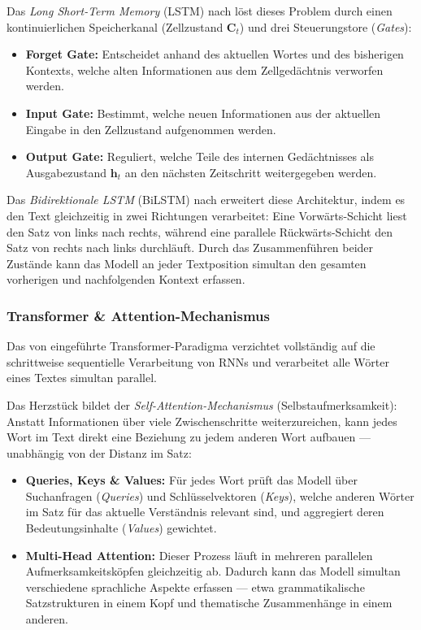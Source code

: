 Das \textit{Long Short-Term Memory} (LSTM) nach \citet{hochreiter1997long} löst dieses Problem durch einen kontinuierlichen Speicherkanal (Zellzustand $\mathbf{C}_t$) und drei Steuerungstore (\textit{Gates}):
\begin{itemize}
    \item \textbf{Forget Gate:} Entscheidet anhand des aktuellen Wortes und des bisherigen Kontexts, welche alten Informationen aus dem Zellgedächtnis verworfen werden.
    \item \textbf{Input Gate:} Bestimmt, welche neuen Informationen aus der aktuellen Eingabe in den Zellzustand aufgenommen werden.
    \item \textbf{Output Gate:} Reguliert, welche Teile des internen Gedächtnisses als Ausgabezustand $\mathbf{h}_t$ an den nächsten Zeitschritt weitergegeben werden.
\end{itemize}

Das \textit{Bidirektionale LSTM} (BiLSTM) nach \citet{schuster1997bidirectional} erweitert diese Architektur, indem es den Text gleichzeitig in zwei Richtungen verarbeitet: Eine Vorwärts-Schicht liest den Satz von links nach rechts, während eine parallele Rückwärts-Schicht den Satz von rechts nach links durchläuft. Durch das Zusammenführen beider Zustände kann das Modell an jeder Textposition simultan den gesamten vorherigen und nachfolgenden Kontext erfassen.

\subsubsection{Transformer \& Attention-Mechanismus}
Das von \citet{vaswani2017attention} eingeführte Transformer-Paradigma verzichtet vollständig auf die schrittweise sequentielle Verarbeitung von RNNs und verarbeitet alle Wörter eines Textes simultan parallel.

Das Herzstück bildet der \textit{Self-Attention-Mechanismus} (Selbstaufmerksamkeit): Anstatt Informationen über viele Zwischenschritte weiterzureichen, kann jedes Wort im Text direkt eine Beziehung zu jedem anderen Wort aufbauen — unabhängig von der Distanz im Satz:
\begin{itemize}
    \item \textbf{Queries, Keys \& Values:} Für jedes Wort prüft das Modell über Suchanfragen (\textit{Queries}) und Schlüsselvektoren (\textit{Keys}), welche anderen Wörter im Satz für das aktuelle Verständnis relevant sind, und aggregiert deren Bedeutungsinhalte (\textit{Values}) gewichtet.
    \item \textbf{Multi-Head Attention:} Dieser Prozess läuft in mehreren parallelen Aufmerksamkeitsköpfen gleichzeitig ab. Dadurch kann das Modell simultan verschiedene sprachliche Aspekte erfassen — etwa grammatikalische Satzstrukturen in einem Kopf und thematische Zusammenhänge in einem anderen.
\end{itemize}


